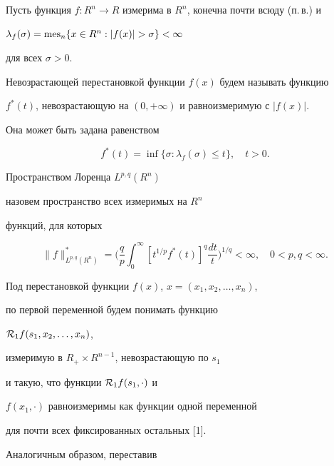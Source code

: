




\maketitle


\label{begin}





Пусть функция $f:R^n\to R$ измерима в $R^n$, конечна почти всюду (п.\,в.) и


$\lambda_f(\sigma)=\mes_n\{x\in R^n: |f(x)|>\sigma\}<\infty$


для всех $\sigma>0$.


Невозрастающей перестановкой функции $f(x)$ будем называть функцию


$f^*(t)$, невозрастающую на $(0,+\infty)$ и равноизмеримую с $|f(x)|$.


Она может быть задана равенством


$$


f^*(t)=\inf\{\sigma:\lambda_{f}(\sigma)\le t\}, \quad t>0.


$$


Пространством Лоренца $L^{p,q}(R^n)$


назовем пространство всех измеримых на $R^n$


функций, для которых


$$


\|f\|_{L^{p,q}(R^n)}^*=


\biggl(\frac{q}{p}\int_0^{\infty}[t^{1/p}f^*(t)]^q


\frac{dt}{t}\biggr)^{1/q} < \infty, \quad 0<p,q<\infty.


$$





Под перестановкой функции $f(x)$, $x=(x_1,x_2,\dotsc, x_n)$,


по первой переменной будем понимать функцию


${\cal R}_{1}f(s_1,x_2,\dotsc, x_n)$,


измеримую в $R_+\times R^{n-1}$, невозрастающую по $s_1$


и такую, что функции ${\cal R}_{1}f(s_1,\cdot)$ и


$f(x_1,\cdot)$ равноизмеримы как функции одной переменной


для почти всех фиксированных остальных [1].


Аналогичным образом, переставив


